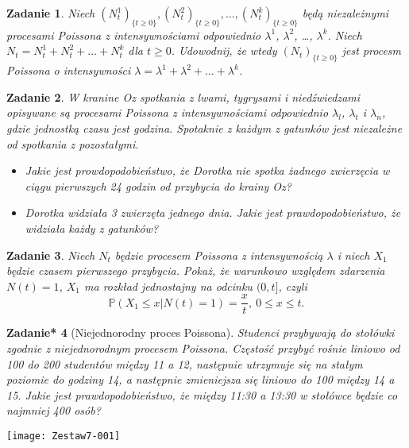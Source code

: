 \documentclass{mwart}
\newtheorem{zd}{Zadanie}
\newtheorem{zdt}[zd]{Zadanie*}
\begin{document}
\begin{zd}
Niech $(N_t^1)_{\{t \geq 0\}}, (N_t^2)_{\{t \geq 0\}}, \dots, (N_t^k)_{\{t \geq 0\}}$ będą niezależnymi procesami Poissona z intensywnościami odpowiednio $\lambda^1$, $\lambda^2$, \dots, $\lambda^k$. Niech $N_t = N_t^1 + N_t^2 + \dots + N_t^k$ dla $t \geq 0$. Udowodnij, że wtedy $(N_t)_{\{t \geq 0\}}$ jest procesm Poissona o intensywności $\lambda = \lambda^1 + \lambda^2 + \dots + \lambda^k$.
\end{zd}

\begin{zd}
W kranine Oz spotkania z lwami, tygrysami i niedźwiedzami opisywane są procesami Poissona z intensywnościami odpowiednio $\lambda_l$, $\lambda_t$ i $\lambda_n$, gdzie jednostką czasu jest godzina. Spotaknie z każdym z gatunków jest niezależne od spotkania z pozostałymi.
\begin{itemize}
\item Jakie jest prowdopodobieństwo, że Dorotka nie spotka żadnego zwierzęcia w ciągu pierwszych 24 godzin od przybycia do krainy Oz?
\item Dorotka widziała 3 zwierzęta jednego dnia. Jakie jest prawdopodobieństwo, że widziała każdy z gatunków?
\end{itemize}
\end{zd}

\begin{zd}
	Niech $N_t$ będzie procesem Poissona z intensywnością $\lambda$ i niech $X_1$ będzie czasem pierwszego przybycia. Pokaż, że warunkowo względem zdarzenia $N(t) = 1$, $X_1$ ma rozkład jednostajny na odcinku $(0,t]$, czyli
	\begin{displaymath}
	\mathbb{P}\left(X_1 \leq x|N(t) = 1\right) = \frac{x}{t},\ 0\leq x\leq t.
	\end{displaymath}
\end{zd}

\begin{zdt}[Niejednorodny proces Poissona] Studenci przybywają do stołówki zgodnie z niejednorodnym procesem Poissona. Częstość przybyć rośnie liniowo od 100 do 200 studentów między 11 a 12, następnie utrzymuje się na stałym poziomie do godziny 14, a następnie zmieniejsza się liniowo do 100 między 14 a 15. Jakie jest prawdopodobieństwo, że między 11:30 a 13:30 w stołówce będzie co najmniej 400 osób?

\end{zdt}

\texttt{[image: Zestaw7-001]}
\end{document}
